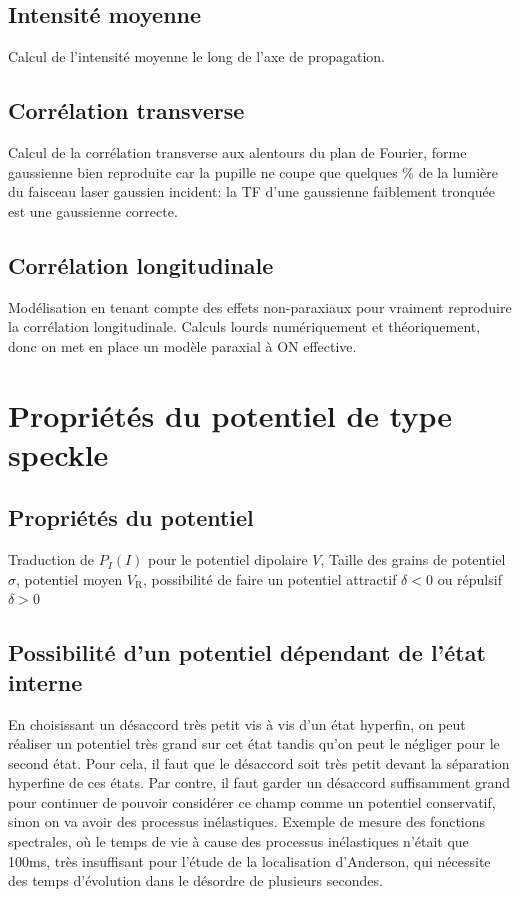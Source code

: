 \subsection{Intensité moyenne}
Calcul de l'intensité moyenne le long de l'axe de propagation.
\subsection{Corrélation transverse}
Calcul de la corrélation transverse aux alentours du plan de Fourier, forme gaussienne bien reproduite car la pupille ne coupe que quelques \% de la lumière du faisceau laser gaussien incident: la TF d'une gaussienne faiblement tronquée est une gaussienne correcte.

\subsection{Corrélation longitudinale}
Modélisation en tenant compte des effets non-paraxiaux pour vraiment reproduire la corrélation longitudinale. Calculs lourds numériquement et théoriquement, donc on met en place un modèle paraxial à ON effective.

\section{Propriétés du potentiel de type speckle}
\subsection{Propriétés du potentiel}
Traduction de $P_I(I)$ pour le potentiel dipolaire $V$, Taille des grains de potentiel $\sigma$, potentiel moyen $V_{\mathrm{R}}$, possibilité de faire un potentiel attractif $\delta <0$ ou répulsif $\delta > 0$
\subsection{Possibilité d'un potentiel dépendant de l'état interne}
En choisissant un désaccord très petit vis à vis d'un état hyperfin, on peut réaliser un potentiel très grand sur cet état tandis qu'on peut le négliger pour le second état. Pour cela, il faut que le désaccord soit très petit devant la séparation hyperfine de ces états. Par contre, il faut garder un désaccord suffisamment grand pour continuer de pouvoir considérer ce champ comme un potentiel conservatif, sinon on va avoir des processus inélastiques. Exemple de mesure des fonctions spectrales, où le temps de vie à cause des processus inélastiques n'était que 100ms, très insuffisant pour l'étude de la localisation d'Anderson, qui nécessite des temps d'évolution dans le désordre de plusieurs secondes.

